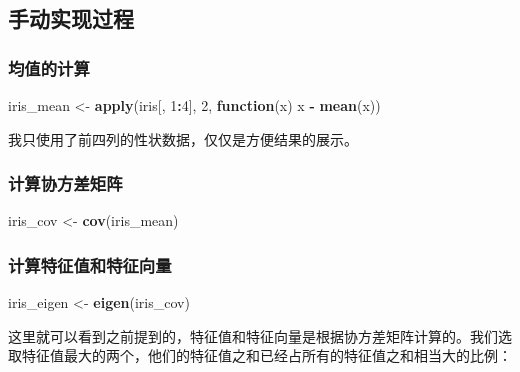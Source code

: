\documentclass[
]{krantz}
\makeatletter
\newenvironment{Shaded}{\begin{snugshade}}{\end{snugshade}}
\newcommand{\ControlFlowTok}[1]{\textcolor[rgb]{0.13,0.29,0.53}{\textbf{#1}}}
\newcommand{\DecValTok}[1]{\textcolor[rgb]{0.00,0.00,0.81}{#1}}
\newcommand{\KeywordTok}[1]{\textcolor[rgb]{0.13,0.29,0.53}{\textbf{#1}}}
\newcommand{\NormalTok}[1]{#1}
\newcommand{\OperatorTok}[1]{\textcolor[rgb]{0.81,0.36,0.00}{\textbf{#1}}}
\newcommand{\StringTok}[1]{\textcolor[rgb]{0.31,0.60,0.02}{#1}}
\newenvironment{kframe}{%
\medskip{}
\setlength{\fboxsep}{.8em}
 \def\at@end@of@kframe{}%
 \ifinner\ifhmode%
  \def\at@end@of@kframe{\end{minipage}}%
  \begin{minipage}{\columnwidth}%
 \fi\fi%
 \def\FrameCommand##1{\hskip\@totalleftmargin \hskip-\fboxsep
 \colorbox{shadecolor}{##1}\hskip-\fboxsep
     \hskip-\linewidth \hskip-\@totalleftmargin \hskip\columnwidth}%
 \MakeFramed {\advance\hsize-\width
   \@totalleftmargin\z@ \linewidth\hsize
   \@setminipage}}%
 {\par\unskip\endMakeFramed%
 \at@end@of@kframe}
\renewenvironment{Shaded}{\begin{kframe}}{\end{kframe}}
\makeatother
\begin{document}
\hypertarget{man_pca}{%
\subsection{手动实现过程}\label{man_pca}}

\hypertarget{av_val}{%
\subsubsection{均值的计算}\label{av_val}}

\begin{Shaded}
\begin{Highlighting}[]
\NormalTok{iris_mean <-}\StringTok{ }\KeywordTok{apply}\NormalTok{(iris[, }\DecValTok{1}\OperatorTok{:}\DecValTok{4}\NormalTok{], }\DecValTok{2}\NormalTok{, }\ControlFlowTok{function}\NormalTok{(x) x }\OperatorTok{-}\StringTok{ }\KeywordTok{mean}\NormalTok{(x))}
\end{Highlighting}
\end{Shaded}

我只使用了前四列的性状数据，仅仅是方便结果的展示。

\hypertarget{cov_val}{%
\subsubsection{计算协方差矩阵}\label{cov_val}}

\begin{Shaded}
\begin{Highlighting}[]
\NormalTok{iris_cov <-}\StringTok{ }\KeywordTok{cov}\NormalTok{(iris_mean)}
\end{Highlighting}
\end{Shaded}

\hypertarget{eig_val}{%
\subsubsection{计算特征值和特征向量}\label{eig_val}}

\begin{Shaded}
\begin{Highlighting}[]
\NormalTok{iris_eigen <-}\StringTok{ }\KeywordTok{eigen}\NormalTok{(iris_cov)}
\end{Highlighting}
\end{Shaded}

这里就可以看到之前提到的，特征值和特征向量是根据协方差矩阵计算的。我们选取特征值最大的两个，他们的特征值之和已经占所有的特征值之和相当大的比例：

\begin{Shaded}
\end{Shaded}
\end{document}
